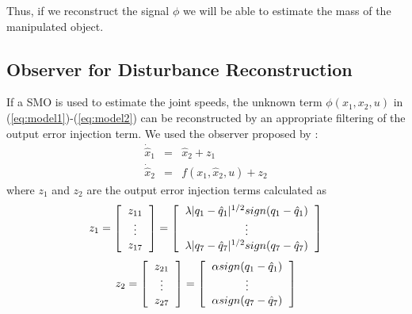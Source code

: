 \documentclass[a4paper, 10pt]{article}
\begin{document}
  Thus, if we reconstruct the signal $\phi$ we will be able to estimate the mass of the manipulated object. 

\subsection{Observer for Disturbance Reconstruction}
If a SMO is used to estimate the joint speeds, the unknown term $\phi(x_1, x_2, u)$ in (\ref{eq:model1})-(\ref{eq:model2}) can be reconstructed by an appropriate filtering of the output error injection term. We used the observer proposed by \cite{shtessel2014sliding}:
  \begin{eqnarray}
    \dot{\hat{x}}_1 &=& \hat{x}_2 + z_1\label{eq:observer1}\\
    \dot{\hat{x}}_2 &=& f(x_1, \hat{x}_2, u) + z_2\label{eq:observer2}
  \end{eqnarray}
  where $z_1$ and $z_2$ are the output error injection terms calculated as
  \begin{equation*}z_1 =
    \left[\begin{tabular}{c}
        $z_{11}$\\
        $\vdots$\\
        $z_{17}$
    \end{tabular}\right] = 
    \left[\begin{tabular}{c}
        $\lambda\vert q_1 - \hat{q}_1\vert ^{1/2}sign(q_1 - \hat{q}_1)$ \\
        $\vdots$\\
        $\lambda\vert q_7 - \hat{q}_7\vert ^{1/2}sign(q_7 - \hat{q}_7)$
    \end{tabular}\right]
\end{equation*}
\begin{equation*}z_2 =
  \left[\begin{tabular}{c}
      $z_{21}$\\
      $\vdots$\\
      $z_{27}$
    \end{tabular}\right] = 
  \left[\begin{tabular}{c}
      $\alpha sign(q_1 - \hat{q}_1)$ \\
      $\vdots$\\
      $\alpha sign(q_7 - \hat{q}_7)$
    \end{tabular}\right]
\end{equation*}
\end{document}
